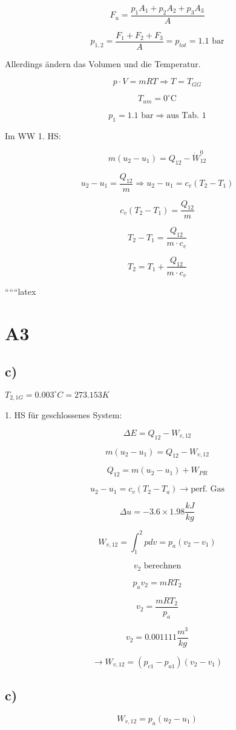 \[
F_u = \frac{p_1 A_1 + p_2 A_2 + p_3 A_3}{A}
\]

\[
p_{1,2} = \frac{F_1 + F_2 + F_3}{A} = p_{tot} = 1.1 \text{ bar}
\]

Allerdings ändern das Volumen und die Temperatur.

\[
p \cdot V = mRT \Rightarrow T = T_{GG}
\]

\[
T_{um} = 0^\circ \text{C}
\]

\[
p_{1} = 1.1 \text{ bar} \Rightarrow \text{aus Tab. 1}
\]

Im WW 1. HS: 

\[
m(u_2 - u_1) = Q_{12} - \dot{W}_{12}^{0}
\]

\[
u_2 - u_1 = \frac{Q_{12}}{m} \Rightarrow u_2 - u_1 = c_v (T_2 - T_1)
\]

\[
c_v (T_2 - T_1) = \frac{Q_{12}}{m}
\]

\[
T_2 - T_1 = \frac{Q_{12}}{m \cdot c_v}
\]

\[
T_2 = T_1 + \frac{Q_{12}}{m \cdot c_v}
\]

``````latex


\section*{A3}

\subsection*{c)}
$T_{2,1G} = 0.003^\circ C = 273.153K$

1. HS für geschlossenes System:

\[
\Delta E = Q_{12} - W_{v,12}
\]

\[
m(u_2 - u_1) = Q_{12} - W_{v,12}
\]

\[
Q_{12} = m(u_2 - u_1) + W_{PR}
\]

\[
u_2 - u_1 = c_v (T_2 - T_a) \rightarrow \text{perf. Gas}
\]

\[
\Delta u = -3.6 \times 1.98 \frac{kJ}{kg}
\]

\[
W_{v,12} = \int_{1}^{2} p dv = p_a (v_2 - v_1)
\]

\[
v_2 \text{ berechnen}
\]

\[
p_a v_2 = m R T_2
\]

\[
v_2 = \frac{m R T_2}{p_a}
\]

\[
v_2 = 0.001111 \frac{m^3}{kg}
\]

\[
\rightarrow W_{v,12} = (p_{c1} - p_{a1}) (v_2 - v_1)
\]

\subsection*{c)}
\[
W_{v,12} = p_a (u_2 - u_1)
\]

